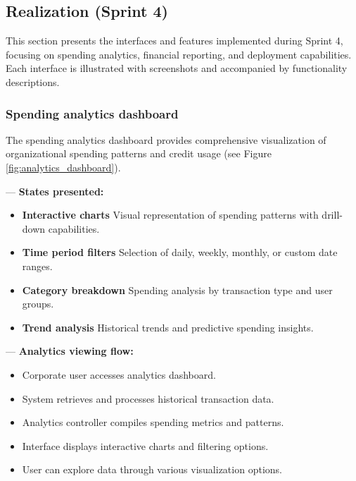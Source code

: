 
\subsection{Realization (Sprint 4)}

This section presents the interfaces and features implemented during Sprint 4, focusing on spending analytics, financial reporting, and deployment capabilities. Each interface is illustrated with screenshots and accompanied by functionality descriptions.

\subsubsection{Spending analytics dashboard}

The spending analytics dashboard provides comprehensive visualization of organizational spending patterns and credit usage (see Figure \ref{fig:analytics_dashboard}).


— \textbf{States presented:}
\begin{itemize}[nosep,leftmargin=*,label=•]
  \item \textbf{Interactive charts}  
    Visual representation of spending patterns with drill-down capabilities.
  \item \textbf{Time period filters}  
    Selection of daily, weekly, monthly, or custom date ranges.
  \item \textbf{Category breakdown}  
    Spending analysis by transaction type and user groups.
  \item \textbf{Trend analysis}  
    Historical trends and predictive spending insights.
\end{itemize}

— \textbf{Analytics viewing flow:}
\begin{itemize}[nosep,leftmargin=*,label=•]
  \item Corporate user accesses analytics dashboard.
  \item System retrieves and processes historical transaction data.
  \item Analytics controller compiles spending metrics and patterns.
  \item Interface displays interactive charts and filtering options.
  \item User can explore data through various visualization options.
\end{itemize}

